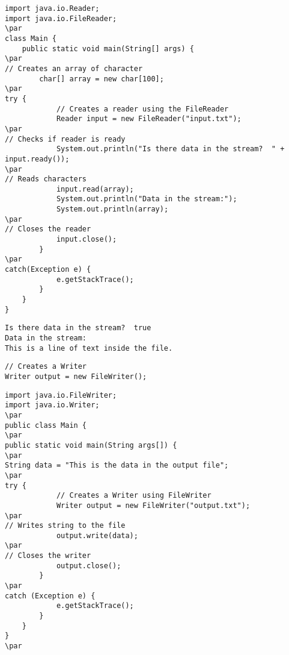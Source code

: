 \documentclass{book}
\def\lthtmlcheckvsize{\ifdim\ht\sizebox<\vsize 
  \ifdim\wd\sizebox<\hsize\expandafter\hfill\fi \expandafter\vfill
  \else\expandafter\vss\fi}%
\begin{document}
{\newpage\clearpage
{}%
\begin{lstlisting}
import java.io.Reader;
import java.io.FileReader;
\par
class Main {
    public static void main(String[] args) {
\par
// Creates an array of character
        char[] array = new char[100];
\par
try {
            // Creates a reader using the FileReader
            Reader input = new FileReader("input.txt");
\par
// Checks if reader is ready 
            System.out.println("Is there data in the stream?  " + input.ready());
\par
// Reads characters
            input.read(array);
            System.out.println("Data in the stream:");
            System.out.println(array);
\par
// Closes the reader
            input.close();
        }
\par
catch(Exception e) {
            e.getStackTrace();
        }
    }
}
\end{lstlisting}%
\lthtmlfigureZ
\lthtmlcheckvsize\clearpage}

{\newpage\clearpage
{}%
\begin{lstlisting}
Is there data in the stream?  true
Data in the stream:
This is a line of text inside the file.
\end{lstlisting}%
\lthtmlfigureZ
\lthtmlcheckvsize\clearpage}

{\newpage\clearpage
{}%
\begin{lstlisting}
// Creates a Writer
Writer output = new FileWriter();
\end{lstlisting}%
\lthtmlfigureZ
\lthtmlcheckvsize\clearpage}

{\newpage\clearpage
{}%
\begin{lstlisting}
import java.io.FileWriter;
import java.io.Writer;
\par
public class Main {
\par
public static void main(String args[]) {
\par
String data = "This is the data in the output file";
\par
try {
            // Creates a Writer using FileWriter
            Writer output = new FileWriter("output.txt");
\par
// Writes string to the file
            output.write(data);
\par
// Closes the writer
            output.close();
        }
\par
catch (Exception e) {
            e.getStackTrace();
        }
    }
}
\par
\end{lstlisting}%
\lthtmlfigureZ
\lthtmlcheckvsize\clearpage}
\end{document}
